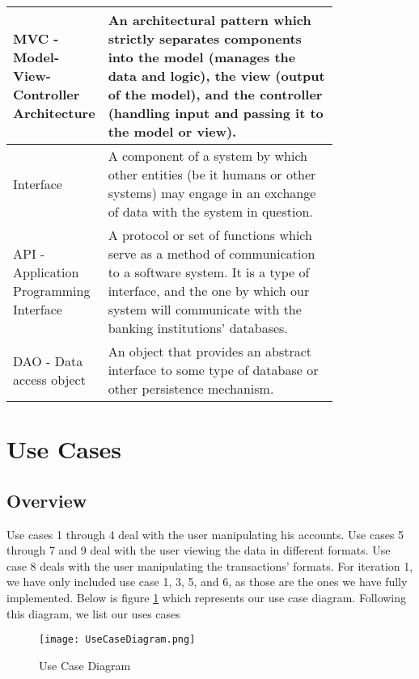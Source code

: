 \documentclass[11pt]{article}
\newcounter{use case ID}
\begin{document}
\begin{table}[H]
\begin{center}
{\begin{tabular}{|l|p{0.8\linewidth}|}
                \hline
                MVC - Model-View-Controller Architecture & An architectural pattern which strictly separates components into the model (manages the data and logic), the view (output of the model), and the controller (handling input and passing it to the model or view).\\
                \hline
                Interface & A component of a system by which other entities (be it humans or other systems) may engage in an exchange of data with the system in question. \\
                \hline
                API - Application Programming Interface & A protocol or set of functions which serve as a method of communication to a software system. It is a type of interface, and the one by which our system will communicate with the banking institutions' databases. \\
                \hline
                DAO - Data access object & An object that provides an abstract interface to some type of database or other persistence mechanism.\\
                \hline

            \end{tabular}}
    \end{center}
\end{table}

\clearpage


\section{Use Cases}
\subsection{Overview}
Use cases 1 through 4 deal with the user manipulating his accounts. Use cases 5 through 7 and 9 deal with the user viewing the data in different formats. Use case 8 deals with the user manipulating the transactions' formats. For iteration 1, we have only included use case 1, 3, 5, and 6, as those are the ones we have fully implemented. Below is figure \ref{fig:use-case-diagram} which represents our use case diagram. Following this diagram, we list our uses cases

\begin{figure}[htbp]
    \texttt{[image: UseCaseDiagram.png]}
    \caption{Use Case Diagram}
    \label{fig:use-case-diagram}
\end{figure}
\end{document}
